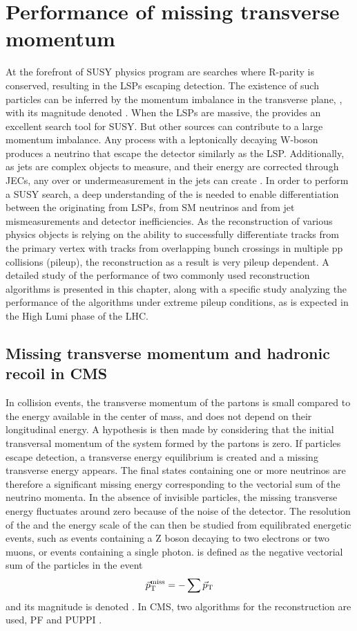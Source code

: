 \chapter{Performance of missing transverse momentum}\label{}
At the forefront of SUSY physics program are searches where R-parity is conserved, resulting in the LSPs escaping detection. The existence of such particles can be inferred by the momentum imbalance in the transverse plane, \ptvecmiss, with its magnitude denoted \ptmiss. When the LSPs are massive, the \ptmiss provides an excellent search tool for SUSY. But other sources can contribute to a large momentum imbalance. Any process with a leptonically decaying W-boson produces a neutrino that escape the detector similarly as the LSP. Additionally, as jets are complex objects to measure, and their energy are corrected through JECs, any over or undermeasurement in the jets can create \ptmiss. In order to perform a SUSY search, a deep understanding of the \ptmiss is needed to enable differentiation between the \ptmiss originating from LSPs, from SM neutrinos and from jet mismeasurements and detector inefficiencies. As the reconstruction of various physics objects is relying on the ability to successfully differentiate tracks from the primary vertex with tracks from overlapping bunch crossings in multiple pp collisions (pileup), the \ptmiss reconstruction as a result is very pileup dependent. A detailed study of the performance of two commonly used \ptmiss reconstruction algorithms is presented in this chapter, along with a specific study analyzing the performance of the algorithms under extreme pileup conditions, as is expected in the High Lumi phase of the LHC.    
\section{Missing transverse momentum and hadronic recoil in CMS}
\label{sec:introduction}
In collision events, the transverse momentum of the partons is small compared to the energy available in the center of mass, and does not depend on their longitudinal energy. A hypothesis is then made by considering that the initial transversal momentum of the system formed by the partons is zero. If particles escape detection, a transverse energy equilibrium is created and a missing transverse energy appears. The final states containing one or more neutrinos are therefore a significant missing energy corresponding to the vectorial sum of the neutrino momenta. 
In the absence of invisible particles, the missing transverse energy fluctuates around zero because of the noise of the detector. The resolution of the \ptmiss and the energy scale of the \ptmiss can then be studied from equilibrated energetic events, such as events containing a Z boson decaying to two electrons or two muons, or events containing a single photon. 
\label{sec:reconstruction}
\ptmiss is defined as the negative vectorial sum of the particles in the event
\begin{equation}
\vec{p}_{\mathrm{T}}^{\mathrm{miss}} =- \sum \vec{p}_{\mathrm{T}}
\end{equation}                                                                      
and its magnitude is denoted \ptmiss. 
In CMS, two algorithms for the \ptmiss reconstruction are used, PF \ptmiss and PUPPI \ptmiss. 
